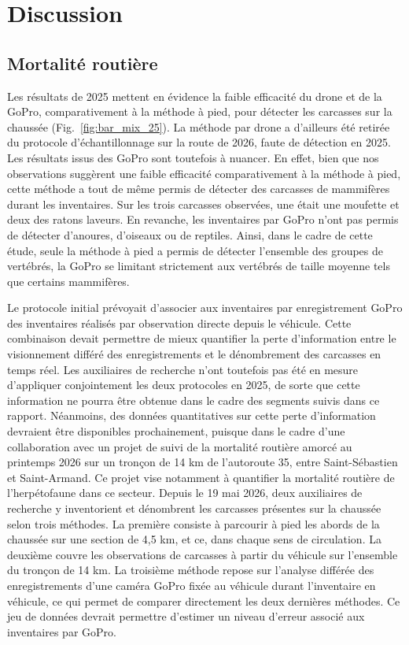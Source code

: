 \section{Discussion}

\subsection{Mortalité routière}

Les résultats de 2025 mettent en évidence la faible efficacité du drone et de la GoPro, comparativement à la méthode à pied, pour détecter les carcasses sur la chaussée (Fig.~\ref{fig:bar_mix_25}). La méthode par drone a d'ailleurs été retirée du protocole d'échantillonnage sur la route de 2026, faute de détection en 2025. Les résultats issus des GoPro sont toutefois à nuancer. En effet, bien que nos observations suggèrent une faible efficacité comparativement à la méthode à pied, cette méthode a tout de même permis de détecter des carcasses de mammifères durant les inventaires. Sur les trois carcasses observées, une était une moufette et deux des ratons laveurs. En revanche, les inventaires par GoPro n'ont pas permis de détecter d'anoures, d'oiseaux ou de reptiles. Ainsi, dans le cadre de cette étude, seule la méthode à pied a permis de détecter l'ensemble des groupes de vertébrés, la GoPro se limitant strictement aux vertébrés de taille moyenne tels que certains mammifères.

Le protocole initial prévoyait d'associer aux inventaires par enregistrement GoPro des inventaires réalisés par observation directe depuis le véhicule. Cette combinaison devait permettre de mieux quantifier la perte d'information entre le visionnement différé des enregistrements et le dénombrement des carcasses en temps réel. Les auxiliaires de recherche n'ont toutefois pas été en mesure d'appliquer conjointement les deux protocoles en 2025, de sorte que cette information ne pourra être obtenue dans le cadre des segments suivis dans ce rapport. Néanmoins, des données quantitatives sur cette perte d'information devraient être disponibles prochainement, puisque dans le cadre d'une collaboration avec un projet de suivi de la mortalité routière amorcé au printemps 2026 sur un tronçon de 14 km de l'autoroute 35, entre Saint-Sébastien et Saint-Armand. Ce projet vise notamment à quantifier la mortalité routière de l'herpétofaune dans ce secteur. Depuis le 19 mai 2026, deux auxiliaires de recherche y inventorient et dénombrent les carcasses présentes sur la chaussée selon trois méthodes. La première consiste à parcourir à pied les abords de la chaussée sur une section de 4,5 km, et ce, dans chaque sens de circulation. La deuxième couvre les observations de carcasses à partir du véhicule sur l'ensemble du tronçon de 14 km. La troisième méthode repose sur l'analyse différée des enregistrements d'une caméra GoPro fixée au véhicule durant l'inventaire en véhicule, ce qui permet de comparer directement les deux dernières méthodes. Ce jeu de données devrait permettre d'estimer un niveau d'erreur associé aux inventaires par GoPro. 

